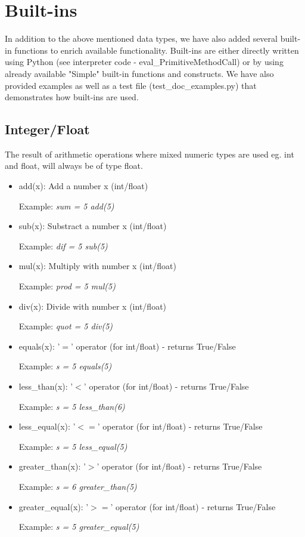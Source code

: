 \documentclass{article}
\begin{document}
\section{Built-ins}
\label{bins}
In addition to the above mentioned data types, we have also added several built-in functions to enrich available functionality. Built-ins are either directly written using Python (see interpreter code - eval\_PrimitiveMethodCall) or by using already available "Simple" built-in functions and constructs. We have also provided examples as well as a test file (test\_doc\_examples.py) that demonstrates how built-ins are used.

\subsection{Integer/Float}
\label{intfloat}
	The result of arithmetic operations where mixed numeric types are used eg. int and float, will always be of type float.

\begin{itemize}
\item add(x): Add a number x (int/float)

Example: \textit{sum = 5 add(5)}

\item sub(x): Substract a number x (int/float)

Example: \textit{dif = 5 sub(5)}

\item mul(x): Multiply with number x (int/float)

Example: \textit{prod = 5 mul(5)}

\item div(x): Divide with number x (int/float)

Example: \textit{quot = 5 div(5)}

\item equals(x): '$=$' operator (for int/float) - returns True/False

Example: \textit{s = 5 equals(5)}

\item less\_than(x): '$<$' operator (for int/float) - returns True/False

Example: \textit{s = 5 less\_than(6)}

\item less\_equal(x): '$<=$' operator (for int/float) - returns True/False

Example: \textit{s = 5 less\_equal(5)}

\item greater\_than(x): '$>$' operator (for int/float) - returns True/False

Example: \textit{s = 6 greater\_than(5)}

\item greater\_equal(x): '$>=$' operator (for int/float) - returns True/False

Example: \textit{s = 5 greater\_equal(5)}
\end{itemize}
\end{document}
